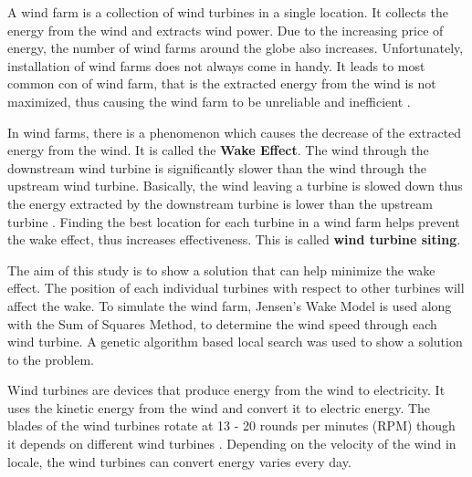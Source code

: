 A wind farm is a collection of wind turbines in a single location. It collects the energy from the wind and extracts wind power. Due to the increasing price of energy, the number of wind farms around the globe also increases. Unfortunately, installation of wind farms does not always come in handy. It leads to most common con of wind farm, that is the extracted energy from the wind is not maximized, thus causing the wind farm to be unreliable and inefficient \cite{windturbine1}.

In wind farms, there is a phenomenon which causes the decrease of the extracted energy from the wind. It is called the \textbf{Wake Effect}. The wind through the downstream wind turbine is significantly slower than the wind through the upstream wind turbine. Basically, the wind leaving a turbine is slowed down thus the energy extracted by the downstream turbine is lower than the upstream turbine \cite{wakeeffect}. Finding the best location for each turbine in a wind farm helps prevent the wake effect, thus increases effectiveness. This is called \textbf{wind turbine siting}.

The aim of this study \cite{this} is to show a solution that can help minimize the wake effect. The position of each individual turbines with respect to other turbines will affect the wake. To simulate the wind farm, Jensen's Wake Model \cite{book2} is used along with the Sum of Squares Method, to determine the wind speed through each wind turbine. A genetic algorithm based local search was used to show a solution to the problem.

Wind turbines are devices that produce energy from the wind to electricity. It uses the kinetic energy from the wind and convert it to electric energy. The blades of the wind turbines rotate at 13 - 20 rounds per minutes (RPM) though it depends on different wind turbines \cite{windturbine2}. Depending on the velocity of the wind in locale, the wind turbines can convert energy varies every day.

